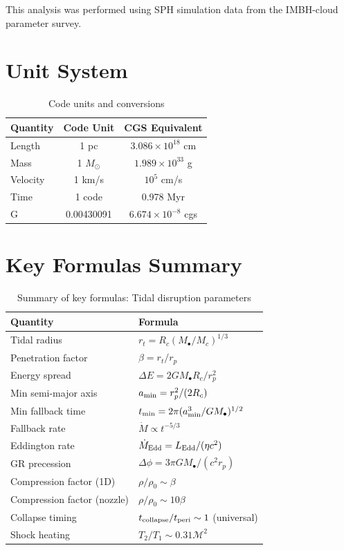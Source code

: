 \documentclass[twocolumn,amsmath,amssymb,prd,superscriptaddress,nofootinbib]{revtex4-2}
\begin{document}
\begin{acknowledgments}
This analysis was performed using SPH simulation data from the IMBH-cloud parameter survey.
\end{acknowledgments}

\appendix

\section{Unit System}
\label{app:units}

\begin{table}[h]
\centering
\caption{Code units and conversions}
\begin{tabular}{lcc}
\toprule
Quantity & Code Unit & CGS Equivalent \\
\midrule
Length & 1 pc & $3.086 \times 10^{18}$ cm \\
Mass & 1 $M_\odot$ & $1.989 \times 10^{33}$ g \\
Velocity & 1 km/s & $10^5$ cm/s \\
Time & 1 code & 0.978 Myr \\
G & 0.00430091 & $6.674 \times 10^{-8}$ cgs \\
\bottomrule
\end{tabular}
\end{table}

\section{Key Formulas Summary}
\label{app:formulas}

\begin{table}[h]
\centering
\caption{Summary of key formulas: Tidal disruption parameters}
\begin{tabular}{ll}
\toprule
Quantity & Formula \\
\midrule
Tidal radius & $r_t = R_c(M_\bullet/M_c)^{1/3}$ \\
Penetration factor & $\beta = r_t/r_p$ \\
Energy spread & $\Delta E = 2GM_\bullet R_c/r_p^2$ \\
Min semi-major axis & $a_{\rm min} = r_p^2/(2R_c)$ \\
Min fallback time & $t_{\rm min} = 2\pi(a_{\rm min}^3/GM_\bullet)^{1/2}$ \\
Fallback rate & $\dot{M} \propto t^{-5/3}$ \\
Eddington rate & $\dot{M}_{\rm Edd} = L_{\rm Edd}/(\eta c^2)$ \\
GR precession & $\Delta\phi = 3\pi GM_\bullet/(c^2 r_p)$ \\
Compression factor (1D) & $\rho/\rho_0 \sim \beta$ \\
Compression factor (nozzle) & $\rho/\rho_0 \sim 10\beta$ \\
Collapse timing & $t_{\rm collapse}/t_{\rm peri} \sim 1$ (universal) \\
Shock heating & $T_2/T_1 \sim 0.31\mathcal{M}^2$ \\
\bottomrule
\end{tabular}
\end{table}
\end{document}
